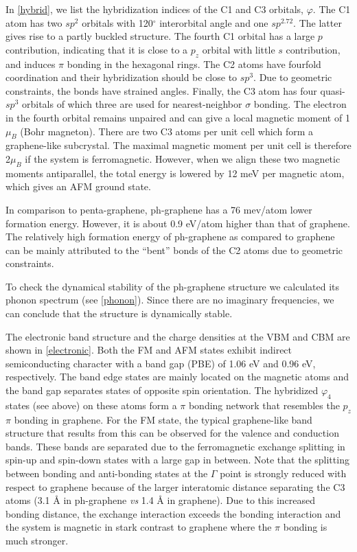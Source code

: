 In \autoref{hybrid}, we list the hybridization indices of the C1 and C3 orbitals, $\varphi$.  The C1 atom has two $sp^2$ orbitals with 120$^{\circ}$ interorbital angle and one $sp^{2.72}$. The latter gives rise to a partly buckled structure. The fourth C1 orbital has a large $p$ contribution, indicating that it is close to a $p_z$ orbital with little $s$ contribution, and induces $\pi$ bonding in the hexagonal rings. The C2 atoms have fourfold coordination and their hybridization should be close to $sp^3$. Due to geometric constraints, the bonds have strained angles\cite{coulson1949}. Finally, the C3 atom has four quasi-$sp^3$ orbitals of which three are used for nearest-neighbor $\sigma$ bonding. The electron in the fourth orbital remains unpaired and can give a local magnetic moment of 1 $\mu_B$ (Bohr magneton). There are two C3 atoms per unit cell which form a graphene-like subcrystal. The maximal magnetic moment per unit cell is therefore  2$\mu_B$ if the system is ferromagnetic. However, when we align these two magnetic moments antiparallel, the total energy is lowered by 12 meV per magnetic atom, which gives an AFM ground state. 

In comparison to penta-graphene, ph-graphene has a 76 mev/atom lower formation energy. However, it is about 0.9 eV/atom higher than that of graphene. The relatively high formation energy of ph-graphene as compared to graphene can be mainly attributed to the ``bent'' bonds of the C2 atoms due to geometric constraints. 

To check the dynamical stability of the ph-graphene structure we calculated its phonon spectrum (see \autoref{phonon}). Since there are no imaginary frequencies, we can conclude that the structure is dynamically stable.

The electronic band structure and the charge densities at the VBM and CBM are shown in \autoref{electronic}. Both the FM and AFM states exhibit indirect semiconducting character with a band gap (PBE) of 1.06 eV and 0.96 eV, respectively. The band edge states are mainly located on the magnetic atoms and the band gap separates states of opposite spin orientation. The hybridized $\varphi_4$ states (see above) on these atoms form a $\pi$ bonding network that resembles the $p_z$ $\pi$ bonding in graphene. For the FM state, the typical graphene-like band structure that results from this can be observed for the valence and conduction bands. These bands are separated due to the ferromagnetic exchange splitting in spin-up and spin-down states with a large gap in between. Note that the splitting between bonding and anti-bonding states at the $\Gamma$ point is strongly reduced with respect to graphene because of the larger interatomic distance separating the C3 atoms (3.1 {\AA} in ph-graphene \textit{vs} 1.4 {\AA} in graphene). Due to this increased bonding distance, the exchange interaction exceeds the bonding interaction and the system is magnetic in stark contrast to graphene where the $\pi$ bonding is much stronger.


